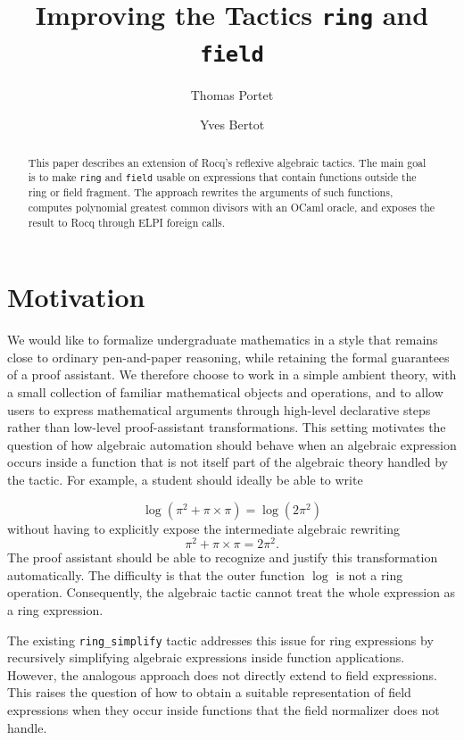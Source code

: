 \documentclass{jflart}
\title{Improving the Tactics \texttt{ring} and \texttt{field}\\
 }
\author[1]{Thomas Portet}
\author[2]{Yves Bertot}
\affil[1]{Université Côte d'Azur, INRIA Sophia Antipolis, France}
\affil[2]{INRIA Sophia Antipolis, France}
\begin{document}
\maketitle

\begin{abstract}
This paper describes an extension of Rocq's \cite{rocq-prover} reflexive algebraic tactics. The main goal is to make \texttt{ring} and \texttt{field} usable on expressions that
contain functions outside the ring or field fragment. The approach rewrites the
arguments of such functions, computes polynomial greatest common divisors with
an OCaml oracle, and exposes the result to Rocq through ELPI foreign calls.
\end{abstract}
\section{Motivation}

We would like to formalize undergraduate mathematics in a style that remains close to ordinary pen-and-paper reasoning, while retaining the formal guarantees of a proof assistant. We therefore choose to work in a simple ambient theory, with a small collection of familiar mathematical objects and operations, and to allow users to express mathematical arguments through high-level declarative steps rather than low-level proof-assistant transformations.
\newline \newline
This setting motivates the question of how algebraic automation should behave when an algebraic expression occurs inside a function that is not itself part of the algebraic theory handled by the tactic. For example, a student should ideally be able to write

\[
\log(\pi^2+\pi\times\pi)=\log(2\pi^2)
\]
without having to explicitly expose the intermediate algebraic rewriting
\[
\pi^2+\pi\times\pi=2\pi^2.
\]
The proof assistant should be able to recognize and justify this transformation automatically.\newline
The difficulty is that the outer function $\log$ is not a ring operation. Consequently, the algebraic tactic cannot treat the whole expression as a ring expression.

The existing \texttt{ring\_simplify} tactic addresses this issue for ring expressions by recursively simplifying algebraic expressions inside function applications.
However, the analogous approach does not directly extend to field expressions. This raises the question of how to obtain a suitable representation of field expressions when they occur inside functions that the field normalizer does not handle.
\end{document}
